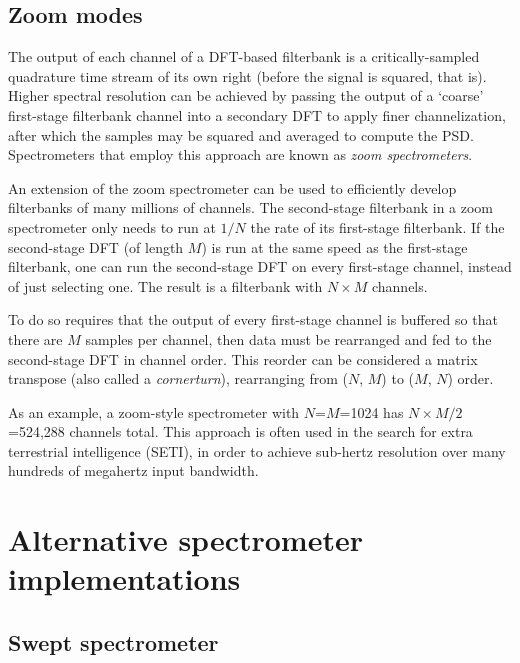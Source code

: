 \documentclass{ws-rv961x669}
\begin{document}
\subsection{Zoom modes}

The output of each channel of a DFT-based filterbank is a critically-sampled quadrature time stream of its own right (before the signal is squared, that is). Higher spectral resolution can be achieved by passing the output of a `coarse' first-stage filterbank channel into a secondary DFT to apply finer channelization, after which the samples may be squared and averaged to compute the PSD. Spectrometers that employ this approach are known as \emph{zoom spectrometers}. 

An extension of the zoom spectrometer can be used to efficiently develop filterbanks of many millions of channels. The second-stage filterbank in a zoom spectrometer only needs to run at $1/N$ the rate of its first-stage filterbank. If the second-stage DFT (of length $M$) is run at the same speed as the first-stage filterbank, one can run the second-stage DFT on every first-stage channel, instead of just selecting one. The result is a filterbank with $N\times M$ channels. 

To do so requires that the output of every first-stage channel is buffered so that there are $M$ samples per channel, then data must be rearranged and fed to the second-stage DFT in channel order. This reorder can be considered a matrix transpose (also called a \emph{cornerturn}), rearranging from ($N$, $M$) to ($M$, $N$) order.

As an example, a zoom-style spectrometer with $N$=$M$=1024 has $N\times M / 2$=524,288 channels total. This approach is often used in the search for extra terrestrial intelligence (SETI)\cite{Siemion2011}, in order to achieve sub-hertz resolution over many hundreds of megahertz input bandwidth.


\section{Alternative spectrometer implementations}

\subsection{Swept spectrometer}\label{swept-spectrometer}

\end{document}
